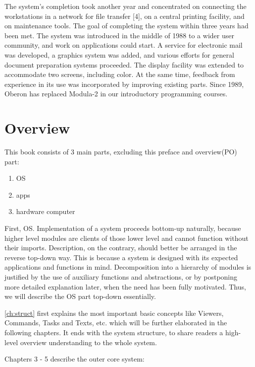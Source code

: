The system's completion took another year and concentrated on connecting the workstations in a
network for file transfer [4], on a central printing facility, and on maintenance tools. The goal of
completing the system within three years had been met. The system was introduced in the middle
of 1988 to a wider user community, and work on applications could start. A service for electronic
mail was developed, a graphics system was added, and various efforts for general document
preparation systems proceeded. The display facility was extended to accommodate two screens,
including color. At the same time, feedback from experience in its use was incorporated by
improving existing parts. Since 1989, Oberon has replaced Modula-2 in our introductory programming courses.

\section{Overview}
This book consists of 3 main parts, excluding this preface and overview(PO) part:
\begin{enumerate}
  \item OS
  \item apps
  \item hardware computer
\end{enumerate}

First, OS. Implementation of a system proceeds bottom-up naturally, because higher level modules are
clients of those lower level and cannot function without their imports. Description, on the contrary,
should better be arranged in the reverse top-down way. This is because a system is designed with its
expected applications and functions in mind. Decomposition into a hierarchy of modules is justified by
the use of auxiliary functions and abstractions, or by postponing more detailed explanation later, when the need has been fully motivated. Thus, we will describe the OS part top-down essentially.

\ref{ch:struct} first explains the most important basic concepts like Viewers, Commands, Tasks and Texts, etc. which will be further elaborated in the following chapters. It ends with the system structure, to share readers a high-level overview understanding to the whole system.

Chapters 3 - 5 describe the outer core system:

